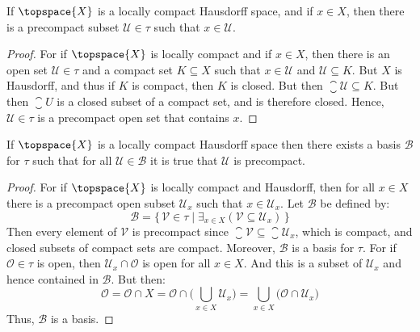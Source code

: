     \begin{theorem}
        If $\topspace{X}$ is a locally compact Hausdorff space, and if
        $x\in{X}$, then there is a precompact subset $\mathcal{U}\in\tau$
        such that $x\in\mathcal{U}$.
    \end{theorem}
    \begin{proof}
        For if $\topspace{X}$ is locally compact and if $x\in{X}$, then
        there is an open set $\mathcal{U}\in\tau$ and a compact set
        $K\subseteq{X}$ such that $x\in\mathcal{U}$ and
        $\mathcal{U}\subseteq{K}$. But $X$ is Hausdorff, and thus if $K$ is
        compact, then $K$ is closed. But then
        $\closure{\mathcal{U}}\subseteq{K}$. But then $\closure{U}$ is a
        closed subset of a compact set, and is therefore closed. Hence,
        $\mathcal{U}\in\tau$ is a precompact open set that contains $x$.
    \end{proof}
    \begin{theorem}
        If $\topspace{X}$ is a locally compact Hausdorff space then there
        exists a basis $\mathcal{B}$ for $\tau$ such that for all
        $\mathcal{U}\in\mathcal{B}$ it is true that $\mathcal{U}$ is
        precompact.
    \end{theorem}
    \begin{proof}
        For if $\topspace{X}$ is locally compact and Hausdorff, then for all
        $x\in{X}$ there is a precompact open subset $\mathcal{U}_{x}$
        such that $x\in\mathcal{U}_{x}$. Let $\mathcal{B}$ be defined by:
        \begin{equation}
            \mathcal{B}=\{\,\mathcal{V}\in\tau\;|\;
                \exists_{x\in{X}}(\mathcal{V}\subseteq\mathcal{U}_{x})\,\}
        \end{equation}
        Then every element of $\mathcal{V}$ is precompact since
        $\closure{\mathcal{V}}\subseteq\closure{\mathcal{U}_{x}}$, which
        is compact, and closed subsets of compact sets are compact.
        Moreover, $\mathcal{B}$ is a basis for $\tau$. For if
        $\mathcal{O}\in\tau$ is open, then $\mathcal{U}_{x}\cap\mathcal{O}$
        is open for all $x\in{X}$. And this is a subset of $\mathcal{U}_{x}$
        and hence contained in $\mathcal{B}$. But then:
        \begin{equation}
            \mathcal{O}=\mathcal{O}\cap{X}
            =\mathcal{O}\cap\Big(\bigcup_{x\in{X}}\mathcal{U}_{x}\Big)
            =\bigcup_{x\in{X}}\big(\mathcal{O}\cap\mathcal{U}_{x}\big)
        \end{equation}
        Thus, $\mathcal{B}$ is a basis.
    \end{proof}
